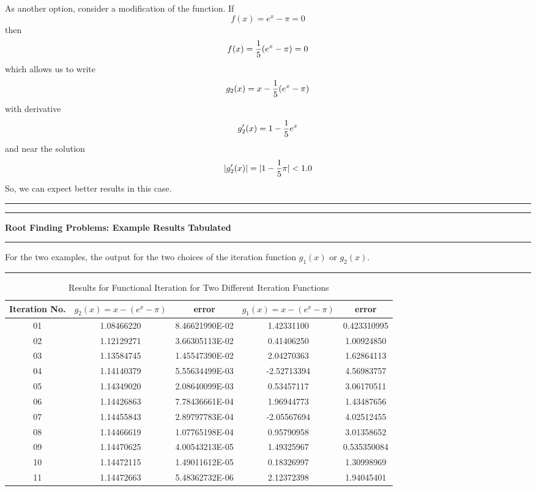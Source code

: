 \documentclass[10pt,fleqn]{article}
\begin{document}
As another option, consider a modification of the function. If
$$
  f(x) = e^x - \pi = 0
$$
then
$$
  f(x) = {1\over 5} ( e^x - \pi ) = 0
$$
which allows us to write
$$
  g_2(x) = x - {1\over 5} ( e^x - \pi )
$$
with derivative
$$
  g_2'(x) = 1 - {1\over 5} e^x 
$$
and near the solution
$$
  |g_2'(x)| = | 1 - {1\over 5} \pi | < 1.0
$$
So, we can expect better results in this case.
\vskip0.1in\hrule\vskip0.1in
\newpage
\vskip0.1in\hrule\vskip0.1in
\noindent
{\bf Root Finding Problems: Example Results Tabulated} 
\vskip0.1in\hrule\vskip0.1in
\noindent
For the two examples, the output for the two choices of the iteration function
$g_1(x)$ or $g_2(x)$.
\vskip0.1in\hrule\vskip0.1in
\begin{table}[h]
\caption{Results for Functional Iteration for Two Different Iteration Functions}
  \vskip0.1in
  \begin{center}
  \begin{tabular}{|c||c|c||c|c|}
    \hline
    Iteration No. & $g_2(x)=x-(e^x-\pi)$ & error
                              & $g_1(x)=x-(e^x-\pi)$ & error \\
    \hline
        01 &  1.08466220  &  8.46621990E-02  & 1.42331100  & 0.423310995 \\
    \hline
        02 &  1.12129271  &  3.66305113E-02  & 0.41406250  & 1.00924850 \\
    \hline
        03 &  1.13584745  &  1.45547390E-02  & 2.04270363  & 1.62864113 \\
    \hline
        04 &  1.14140379  &  5.55634499E-03  &-2.52713394  & 4.56983757 \\
    \hline
        05 &  1.14349020  &  2.08640099E-03  & 0.53457117  & 3.06170511 \\
    \hline
        06 &  1.14426863  &  7.78436661E-04  & 1.96944773  & 1.43487656 \\
    \hline
        07 &  1.14455843  &  2.89797783E-04  &-2.05567694  & 4.02512455 \\
    \hline
        08 &  1.14466619  &  1.07765198E-04  & 0.95790958  & 3.01358652 \\
    \hline
        09 &  1.14470625  &  4.00543213E-05  & 1.49325967  & 0.535350084 \\
    \hline
        10 &  1.14472115  &  1.49011612E-05  & 0.18326997  & 1.30998969 \\
    \hline
        11 &  1.14472663  &  5.48362732E-06  & 2.12372398  & 1.94045401 \\
    \hline
  \end{tabular}
  \end{center}
\end{table}
\end{document}

